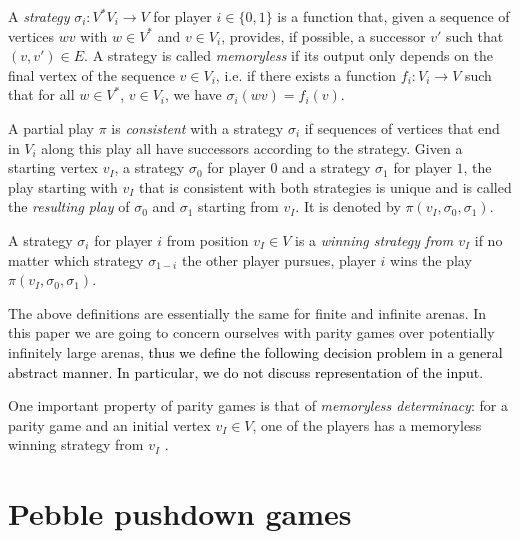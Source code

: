 \documentclass[a4paper,UKenglish,cleveref, autoref, thm-restate]{lipics-v2021}
\newcommand{\problemx}[3]{
	\vspace{0.2cm}
\par\noindent\underline{\sc#1}\par\nobreak\vskip.2\baselineskip
\begingroup\clubpenalty10000\widowpenalty10000
\setbox0\hbox{\bf INPUT:\ }\setbox1\hbox{\bf QUESTION:\ }
\dimen0=\wd0\ifnum\wd1>\dimen0\dimen0=\wd1\fi
\vskip-\parskip\noindent
\hbox to\dimen0{\box0\hfil}\hangindent\dimen0\hangafter1\ignorespaces#2\par
\vskip-\parskip\noindent
\hbox to\dimen0{\box1\hfil}\hangindent\dimen0\hangafter1\ignorespaces#3\par
\endgroup
	\vspace{-0.2cm}
}
\begin{document}
A {\em strategy} $\sigma_i : V^* V_i \to V$ for player $i \in \{ 0,1\}$ is a function that, given a sequence of vertices $ w v$  with $w\in V^*$ and $v \in V_i$,
provides, if possible, a successor $v'$ such that $(v,v') \in E$.
A strategy is called {\em memoryless} if its output only depends on the final vertex of the sequence $v \in V_i$, i.e. if there exists a function $f_i : V_i \to V$ such
that for all $w\in V^*$, $v \in V_i$, we have $\sigma_i(wv) = f_i(v)$.

A partial play $\pi$ is {\em consistent} with a strategy $\sigma_i$ if sequences of vertices that end in $V_i$ along this play all have successors according to the strategy. Given a starting vertex $v_I$,   a strategy $\sigma_0$ for player $0$ and a strategy $\sigma_1$ for player $1$, the play
starting with $v_I$ that is consistent with both strategies is unique and is called the {\em resulting play} of $\sigma_0$ and $\sigma_1$ starting from $v_I$. It is 
denoted by $\pi(v_I, \sigma_0, \sigma_1)$.


A strategy $\sigma_i$ for player $i$ from position $v_I \in V$ is a {\em winning strategy from $v_I$} if 
no matter which
strategy $\sigma_{1-i}$ the other player pursues,
player $i$ wins the play $\pi(v_I, \sigma_0, \sigma_1)$.


The above definitions are essentially the same for finite and infinite arenas.
%
%
In this paper we are going to concern ourselves with parity games over potentially infinitely large arenas, \textcolor{black}{thus we define the following decision problem in a general abstract manner. In particular, we do not discuss representation of the input}. 


One important property of parity games is that of {\em memoryless determinacy}: for a parity game and an initial vertex $v_I \in V$, one of the players has a memoryless winning strategy from $v_I$ \cite{zielonka1998infinite}.




\section{Pebble pushdown games}
\end{document}
